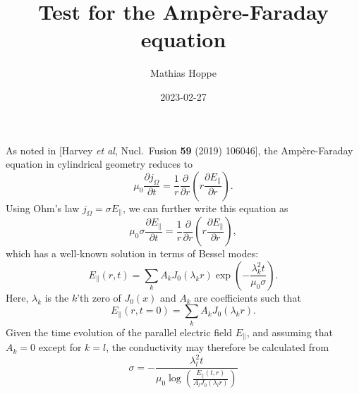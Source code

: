\documentclass{notes}
\title{Test for the Amp\`ere-Faraday equation}
\author{Mathias Hoppe}
\date{2023-02-27}
\begin{document}
    \maketitle

    \noindent
    As noted in [Harvey {\em et al}, Nucl.\ Fusion {\bf 59} (2019) 106046], the
    Amp\`ere-Faraday equation in cylindrical geometry reduces to
    \begin{equation}
        \mu_0\frac{\partial j_\Omega}{\partial t} = \frac{1}{r}\frac{\partial}{\partial r}\left(
            r\frac{\partial E_\parallel}{\partial r}
        \right).
    \end{equation}
    Using Ohm's law $j_\Omega = \sigma E_\parallel$, we can further write this
    equation as
    \begin{equation}
        \mu_0\sigma\frac{\partial E_\parallel}{\partial t} = \frac{1}{r}\frac{\partial}{\partial r}\left(
            r\frac{\partial E_\parallel}{\partial r}
        \right),
    \end{equation}
    which has a well-known solution in terms of Bessel modes:
    \begin{equation}
        E_\parallel(r,t) = \sum_k A_k J_0\left(\lambda_k r\right)
        \exp\left( -\frac{\lambda_k^2 t}{\mu_0\sigma} \right).
    \end{equation}
    Here, $\lambda_k$ is the $k$'th zero of $J_0(x)$ and $A_k$ are coefficients
    such that
    \begin{equation}
        E_\parallel(r,t=0) = \sum_k A_k J_0(\lambda_k r).
    \end{equation}
    Given the time evolution of the parallel electric field $E_\parallel$, and
    assuming that $A_k=0$ except for $k=l$, the conductivity may therefore be
    calculated from
    \begin{equation}
        \sigma = -\frac{\lambda_l^2 t}{\mu_0\log\left(\frac{E_\parallel(t,r)}{A_l J_0(\lambda_lr)}\right)}
    \end{equation}
\end{document}
